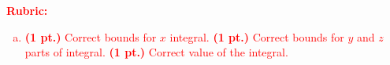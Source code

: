 \documentclass[12pt]{article} %
\begin{document}
\vspace*{1cm}
\textcolor{red}{
\noindent \textbf{Rubric:}
\begin{enumerate}[(a)]
    \item \textbf{(1 pt.)} Correct bounds for $x$ integral. \textbf{(1 pt.)} Correct bounds for $y$ and $z$ parts of integral. \textbf{(1 pt.)} Correct value of the integral.
\end{enumerate}
}
\end{document}
